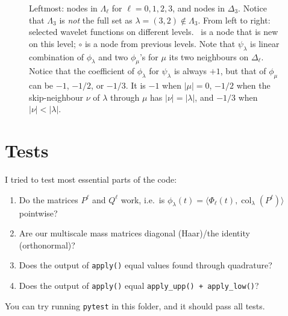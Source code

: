 \documentclass[11pt,a4paper]{amsart}
\theoremstyle{definition}
\DeclareMathOperator{\col}{col}
\begin{document}
\begin{figure}
\hspace{-0.5em}
  \caption{Leftmost: nodes in $\Lambda_\ell$ for $\ell=0,1,2,3$, and nodes in $\Delta_3$. Notice that $\Lambda_3$ is \emph{not} the full set as $\lambda=(3,2) \not\in \Lambda_3$. From left to right: selected wavelet functions on different levels. \textbullet\ is a node that is new on this level; $\circ$ is a node from previous levels. Note that $\psi_\lambda$ is linear combination of $\phi_\lambda$ and two $\phi_\mu$'s for $\mu$ its two neighbours on $\Delta_{\ell}$. Notice that the coefficient of $\phi_\lambda$ for $\psi_\lambda$ is always $+1$, but that of $\phi_\mu$ can be $-1$, $-1/2$, or $-1/3$. It is $-1$ when $|\mu| = 0$, $-1/2$ when the skip-neighbour $\nu$ of $\lambda$ through $\mu$ has $|\nu| = |\lambda|$, and $-1/3$ when $|\nu| < |\lambda|$.}
\end{figure}

\section{Tests}
I tried to test most essential parts of the code:
\begin{enumerate}
  \item Do the matrices $P^\ell$ and $Q^\ell$ work, i.e.~is $\phi_\lambda(t) = \langle \Phi_\ell(t), \col_\lambda(P^\ell) \rangle$ pointwise?
  \item Are our multiscale mass matrices diagonal (Haar)/the identity (orthonormal)?
  \item Does the output of \texttt{apply()} equal values found through quadrature?
  \item Does the output of \texttt{apply()} equal \texttt{apply\_upp() + apply\_low()}?
\end{enumerate}
You can try running \texttt{pytest} in this folder, and it should pass all tests.
\end{document}
